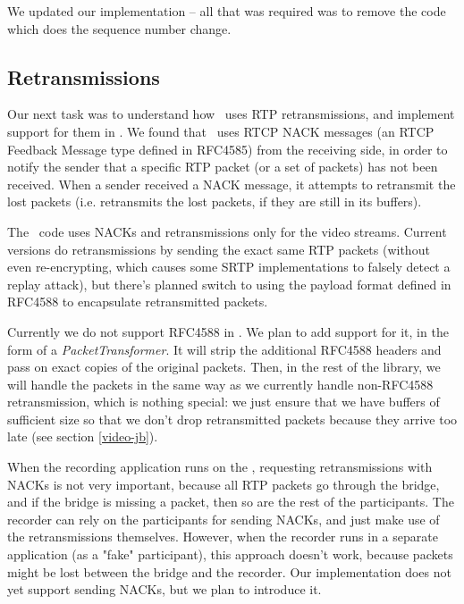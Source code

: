 \documentclass[twoside,openright,a4paper,12pt,english]{article}
\begin{document}
We updated our implementation -- all that was required was to remove the
code which does the sequence number change.



\subsection{Retransmissions}
\label{rtx}
Our next task was to understand how \wrtc\ uses RTP retransmissions, and
implement support for them in \lj. We found that \wrtc\ uses RTCP NACK messages
(an RTCP Feedback Message type defined in RFC4585\cite{rfc4585}) from the
receiving side, in order to notify the sender that a specific RTP packet (or a
set of packets) has not been received. When a sender received a NACK message,
it attempts to retransmit the lost packets (i.e. retransmits the lost packets,
if they are still in its buffers).

The \wrtc\ code uses NACKs and retransmissions only for the
video streams. Current versions do retransmissions by sending the exact same
RTP packets (without even re-encrypting, which causes some SRTP implementations
to falsely detect a replay attack), but there's planned switch to using the
payload format defined in RFC4588\cite{rfc4588} to encapsulate retransmitted packets.

Currently we do not support RFC4588 in \lj. We plan to add support for it, in the form
of a \emph{PacketTransformer}. It will strip the additional RFC4588 headers and pass on
exact copies of the original packets. Then, in the rest of the library, we will handle the packets
in the same way as we currently handle non-RFC4588 retransmission, which is nothing special:
we just ensure that we have buffers of sufficient size so that we don't drop
retransmitted packets because they arrive too late (see section
\ref{video-jb}).

\medskip
When the recording application runs on the \jvb, requesting retransmissions with NACKs is not
very important, because all RTP packets go through the bridge, and if the
bridge is missing a packet, then so are the rest of the participants. The recorder can
rely on the participants for sending NACKs, and just make use of the retransmissions themselves.  
However, when the recorder runs in a separate application (as a "fake"
participant), this approach doesn't work, because packets might be lost between
the bridge and the recorder. Our implementation does not yet support sending NACKs, but we plan
to introduce it.
\end{document}
